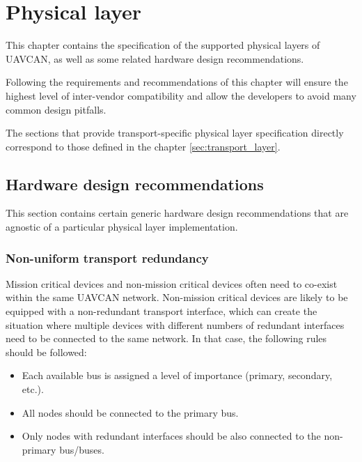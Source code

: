 \chapter{Physical layer}\label{sec:physical_layer}

This chapter contains the specification of the supported physical layers of UAVCAN,
as well as some related hardware design recommendations.

Following the requirements and recommendations of this chapter will ensure the highest level of
inter-vendor compatibility and allow the developers to avoid many common design pitfalls.

The sections that provide transport-specific physical layer specification
directly correspond to those defined in the chapter \ref{sec:transport_layer}.

\clearpage

\clearpage
\section{Hardware design recommendations}

This section contains certain generic hardware design recommendations that are agnostic of a particular
physical layer implementation.

\subsection{Non-uniform transport redundancy}

Mission critical devices and non-mission critical devices often need to co-exist within the same UAVCAN network.
Non-mission critical devices are likely to be equipped with a non-redundant transport interface,
which can create the situation where multiple devices with different numbers of redundant interfaces
need to be connected to the same network.
In that case, the following rules should be followed:

\begin{itemize}
    \item Each available bus is assigned a level of importance (primary, secondary, etc.).
    \item All nodes should be connected to the primary bus.
    \item Only nodes with redundant interfaces should be also connected to the non-primary bus/buses.
\end{itemize}

